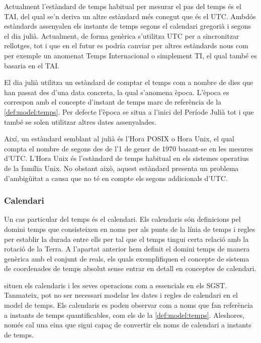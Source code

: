 Actualment l'estàndard de temps habitual per mesurar el pas del temps
és el \gls{TAI}, del qual se'n deriva un altre estàndard més conegut
que és el \gls{UTC}.  Ambdós estàndards assenyalen els instants de
temps segons el calendari gregorià i segons el dia julià. Actualment,
de forma genèrica s'utilitza \gls{UTC} per a sincronitzar rellotges,
tot i que en el futur es podria canviar per altres estàndards nous com
per exemple un anomenat Temps Internacional o simplement TI, el qual
també es basaria en el \gls{TAI}.

El dia julià utilitza un estàndard de comptar el temps com a
nombre de dies que han passat des d'una data concreta, la qual
s'anomena època. L'època es correspon amb el concepte d'instant de
temps marc de referència de la \autoref{def:model:temps}. Per defecte
l'època se situa a l'inici del Període Julià tot i que també se solen
utilitzar altres dates assenyalades.

Així, un estàndard semblant al julià és l'Hora POSIX o Hora Unix, el
qual compta el nombre de segons des de l'1 de gener de 1970 basant-se
en les mesures d'\gls{UTC}. L'Hora Unix és l'estàndard de temps
habitual en els sistemes operatius de la família Unix. No obstant
això, aquest estàndard presenta un problema d'ambigüitat a causa que
no té en compte els segons addicionals d'\gls{UTC}.





\subsubsection{Calendari}

Un cas particular del temps és el calendari. Els calendaris són
definicions pel domini temps que consisteixen en noms per als punts de
la línia de temps i regles per establir la durada entre ells per tal
que el temps tingui certa relació amb la rotació de la Terra. A
l'apartat anterior hem definit el domini temps de manera genèrica amb
el conjunt de reals, els quals exemplifiquen  el concepte
de sistema de coordenades de temps absolut sense entrar en detall en
conceptes de calendari.

\textcite{dreyer94} situen els calendaris i les seves operacions com a
essencials en els \gls{SGST}. Tanmateix, pot no ser necessari modelar les
dates i regles de calendari en el model de temps. Els calendaris es
poden observar com a noms que fan referència a instants de temps
quantificables, com els de la \autoref{def:model:temps}. Aleshores,
només cal una eina que sigui capaç de convertir els noms de calendari
a instants de temps.

